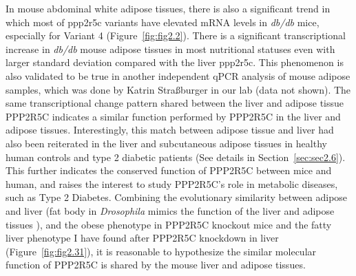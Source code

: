 In mouse abdominal white adipose tissues, there is also a significant trend in which most of \gls{ppp2r5c} variants have elevated mRNA levels in \textit{db/db} mice, especially for Variant 4 (Figure~\ref{fig:fig2.2}). There is a significant transcriptional increase in \textit{db/db} mouse adipose tissues in most nutritional statuses even with larger standard deviation compared with the liver \gls{ppp2r5c}. This phenomenon is also validated to be true in another independent qPCR analysis of mouse adipose samples, which was done by Katrin Stra{\ss}burger in our lab (data not shown). The same transcriptional change pattern shared between the liver and adipose tissue PPP2R5C indicates a similar function performed by PPP2R5C in the liver and adipose tissues. Interestingly, this match between adipose tissue and liver had also been reiterated in the liver and subcutaneous adipose tissues in healthy human controls and type 2 diabetic patients (See details in Section~\ref{sec:sec2.6}). This further indicates the conserved function of PPP2R5C between mice and human, and raises the interest to study PPP2R5C's role in metabolic diseases, such as Type 2 Diabetes. Combining the evolutionary similarity between adipose and liver (fat body in \textit{Drosophila} mimics the function of the liver and adipose tissues \cite{hietakangas_regulation_2009}), and the obese phenotype in PPP2R5C knockout mice and the fatty liver phenotype I have found after PPP2R5C knockdown in liver (Figure~\ref{fig:fig2.31}), it is reasonable to hypothesize the similar molecular function of PPP2R5C is shared by the mouse liver and adipose tissues. 

